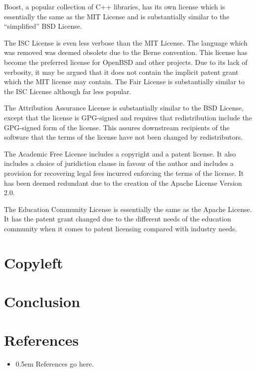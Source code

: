 \documentclass[12pt,letterpaper]{article}
\begin{document}
Boost, a popular collection of C++ libraries, has its own license which is essentially the same as the MIT License and is substantially similar to the ``simplified'' BSD License.

The ISC License is even less verbose than the MIT License. The language which was removed was deemed obsolete due to the Berne convention. This license has become the preferred license for OpenBSD and other projects. Due to its lack of verbosity, it may be argued that it does not contain the implicit patent grant which the MIT license may contain. The Fair License is substantially similar to the ISC License although far less popular.

The Attribution Assurance License is substantially similar to the BSD License, except that the license is GPG-signed and requires that redistribution include the GPG-signed form of the license. This assures downstream recipients of the software that the terms of the license have not been changed by redistributors.

The Academic Free License includes a copyright and a patent license. It also includes a choice of juridiction clause in favour of the author and includes a provision for recovering legal fees incurred enforcing the terms of the license. It has been deemed redundant due to the creation of the Apache License Version 2.0.

The Education Community License is essentially the same as the Apache License. It has the patent grant changed due to the different needs of the education community when it comes to patent licensing compared with industry needs.

\section{Copyleft}

\section{Conclusion}

\newpage
\section*{References}

\begin{itemize}[label={},itemindent=-15pt]

\item \openup 0.5em References go here.

\end{itemize}
\end{document}

